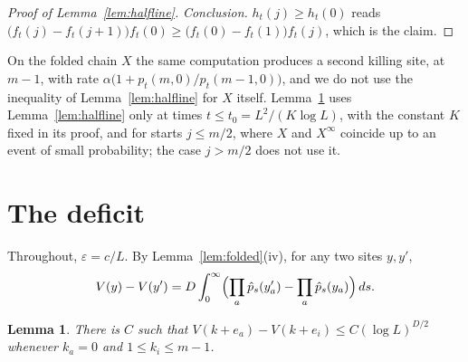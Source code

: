 \documentclass[11pt]{amsart}
\newtheorem{lemma}[theorem]{Lemma}
\theoremstyle{remark}
\newcommand{\eps}{\varepsilon}
\begin{document}
\begin{proof}[Proof of Lemma~\ref{lem:halfline}]
\emph{Conclusion.} $h_t(j)\ge h_t(0)$ reads $\bigl(f_t(j)-f_t(j+1)\bigr)f_t(0)\ge\bigl(f_t(0)-f_t(1)\bigr)f_t(j)$,
which is the claim.
\end{proof}

On the folded chain $X$ the same computation produces a second killing site, at $m-1$, with rate
$\alpha\bigl(1+p_t(m,0)/p_t(m-1,0)\bigr)$, and we do not use the inequality of Lemma~\ref{lem:halfline} for $X$
itself. Lemma~\ref{lem:Aprime} uses Lemma~\ref{lem:halfline} only at times
$t\le t_0=L^2/(K\log L)$, with the constant $K$ fixed in its proof, and for starts $j\le m/2$, where $X$ and $X^\infty$ coincide up to an event of small
probability; the case $j>m/2$ does not use it.

\section{The deficit}\label{sec:deficit}

Throughout, $\eps=c/L$. By Lemma~\ref{lem:folded}(iv), for any two sites $y,y'$,
\begin{equation}\label{eq:diff}
V(y)-V(y')=D\int_0^\infty\Bigl(\prod_a\hat p_s(y'_a)-\prod_a\hat p_s(y_a)\Bigr)\,ds .
\end{equation}

\begin{lemma}\label{lem:Aprime}
There is $C$ such that $V(k+e_a)-V(k+e_i)\le C(\log L)^{D/2}$ whenever $k_a=0$ and $1\le k_i\le m-1$.
\end{lemma}
\end{document}
